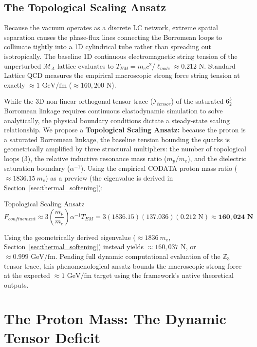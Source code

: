 \subsection{The Topological Scaling Ansatz}

Because the vacuum operates as a discrete LC network, extreme spatial separation causes the phase-flux lines connecting the Borromean loops to collimate tightly into a 1D cylindrical tube rather than spreading out isotropically. The baseline 1D continuous electromagnetic string tension of the unperturbed $\mathcal{M}_{A}$ lattice evaluates to $T_{EM}=m_{e}c^{2}/\ell_{node}\approx0.212\text{ N}$. Standard Lattice QCD measures the empirical macroscopic strong force string tension at exactly $\approx 1\text{ GeV/fm}$ ($\approx 160,200\text{ N}$). 

While the 3D non-linear orthogonal tensor trace ($\mathcal{I}_{tensor}$) of the saturated $6_2^3$ Borromean linkage requires continuous elastodynamic simulation to solve analytically, the physical boundary conditions dictate a steady-state scaling relationship. We propose a \textbf{Topological Scaling Ansatz:} because the proton is a saturated Borromean linkage, the baseline tension bounding the quarks is geometrically amplified by three structural multipliers: the number of topological loops (3), the relative inductive resonance mass ratio ($m_p/m_e$), and the dielectric saturation boundary ($\alpha^{-1}$). Using the empirical CODATA proton mass ratio ($\approx 1836.15 \ m_e$) as a preview (the eigenvalue is derived in Section~\ref{sec:thermal_softening}):

\begin{resultbox}{Topological Scaling Ansatz}
\begin{equation}
    F_{confinement} \approx 3\left(\frac{m_p}{m_e}\right)\alpha^{-1}T_{EM} = 3(1836.15)(137.036)(0.212\text{ N}) \approx \mathbf{160,024\text{ N}}
\end{equation}
\end{resultbox}
    
Using the geometrically derived eigenvalue ($\approx 1836\ m_e$, Section~\ref{sec:thermal_softening}) instead yields $\approx 160{,}037\text{ N}$, or $\approx 0.999\text{ GeV/fm}$. Pending full dynamic computational evaluation of the $\mathbb{Z}_3$ tensor trace, this phenomenological ansatz bounds the macroscopic strong force at the expected $\approx 1\text{ GeV/fm}$ target using the framework's native theoretical outputs.

\section{The Proton Mass: The Dynamic Tensor Deficit}


